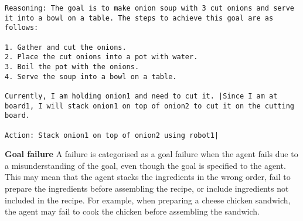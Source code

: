 
\begin{lstlisting}
Reasoning: The goal is to make onion soup with 3 cut onions and serve it into a bowl on a table. The steps to achieve this goal are as follows:

1. Gather and cut the onions.
2. Place the cut onions into a pot with water.
3. Boil the pot with the onions.
4. Serve the soup into a bowl on a table.

Currently, I am holding onion1 and need to cut it. |Since I am at board1, I will stack onion1 on top of onion2 to cut it on the cutting board.

Action: Stack onion1 on top of onion2 using robot1|
\end{lstlisting}

\textbf{Goal failure}
A failure is categorised as a goal failure when the agent fails due to a misunderstanding of the goal, even though the goal is specified to the agent. This may mean that the agent stacks the ingredients in the wrong order, fail to prepare the ingredients before assembling the recipe, or include ingredients not included in the recipe. For example, when preparing a cheese chicken sandwich, the agent may fail to cook the chicken before assembling the sandwich. 


